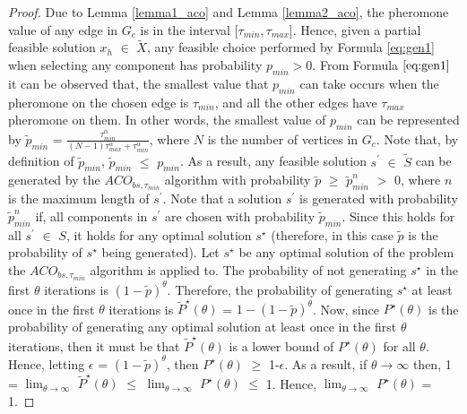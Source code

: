 \documentclass[12pt]{article}
\numberwithin{equation}{subsection}
\numberwithin{table}{subsection}
\numberwithin{algorithm}{subsection}
\numberwithin{figure}{subsection}
\begin{document}
\begin{proof}
Due to Lemma \ref{lemma1_aco} and Lemma \ref{lemma2_aco}, the pheromone value of any edge in $G_c$ is in the interval [$\tau_{min},\tau_{max}$]. Hence, given a partial feasible solution $x_h$ $\in$ $\widetilde{X}$, any feasible choice performed by Formula \ref{eq:gen1} when selecting any component has probability $p_{min} > 0$. From Formula $\ref{eq:gen1}$ it can be observed that, the smallest value that $p_{min}$ can take occurs when the pheromone on the chosen edge is $\tau_{min}$, and all the other edges have $\tau_{max}$ pheromone on them. In other words, the smallest value of $p_{min}$ can be represented by $\widetilde{p}_{min}$ = $\displaystyle{\frac{\tau_{min}^\alpha}{(N-1)\tau_{max}^\alpha + \tau_{min}^\alpha}}$, where $N$ is the number of vertices in $G_c$. Note that, by definition of $\widetilde{p}_{min}$, $\widetilde{p}_{min}$ $\leq$ $p_{min}$. As a result, any feasible solution $s^\prime$ $\in$ $\widetilde{S}$ can be generated by the $ACO_{bs, \tau_{min}}$ algorithm with probability  $\widetilde{p}$ $\geq$ $\widetilde{p}_{min}^n$ $>$ 0, where $n$ is the maximum length of $s^\prime$. Note that a solution $s^\prime$ is generated with probability $\widetilde{p}_{min}^n$ if, all components in $s^\prime$ are chosen with probability $\widetilde{p}_{min}$. Since this holds for all $s^\prime$ $\in$ $S$, it holds for any optimal solution $s^\star$ (therefore, in this case $\widetilde{p}$ is the probability of $s^\star$ being generated). Let $s^\star$ be any optimal solution of the problem the $ACO_{bs, \tau_{min}}$ algorithm is applied to. The probability of not generating $s^\star$ in the first $\theta$ iterations is $(1-\widetilde{p})^\theta$. Therefore, the probability of generating $s^\star$ at least once in the first $\theta$ iterations is $\widetilde{P}^\star(\theta)$ = $1- (1-\widetilde{p})^\theta$. Now, since $P^\star(\theta)$ is the probability of generating any optimal solution at least once in the first $\theta$ iterations, then it must be that $\widetilde{P}^\star(\theta)$ is a lower bound of $P^\star(\theta)$ for all $\theta$. Hence, letting $\epsilon$ = $(1-\widetilde{p})^\theta$, then $P^\star(\theta)$ $\geq$ 1-$\epsilon$. As a result, if $\theta\to\infty$ then, 1 = $\lim_{\theta\to\infty}$ $\widetilde{P}^\star(\theta)$ $\leq$  $\lim_{\theta\to\infty}$ $P^\star(\theta)$ $\leq$ 1. Hence, $\lim_{\theta\to\infty}$ $P^\star(\theta)$ = 1.
\end{proof}
\end{document}
